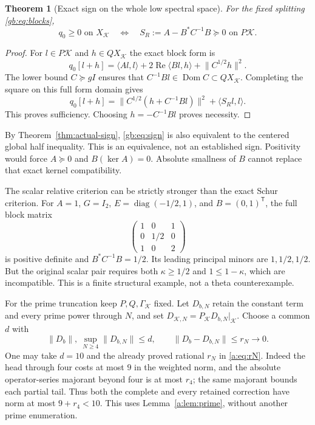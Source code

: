 \documentclass[11pt,a4paper]{article}
\numberwithin{equation}{section}
\newtheorem{theorem}{Theorem}[section]
\theoremstyle{definition}\newtheorem{definition}[theorem]{Definition}
\theoremstyle{remark}\newtheorem{remark}[theorem]{Remark}
\newcommand{\dom}{\operatorname{Dom}}\newcommand{\Var}{\operatorname{Var}}
\newcommand{\ip}[2]{\langle#1,#2\rangle}\newcommand{\norm}[1]{\lVert#1\rVert}\newcommand{\abs}[1]{\lvert#1\rvert}
\newcommand{\Kk}{\mathcal K}\newcommand{\Aa}{\mathcal A}\newcommand{\Ff}{\mathcal F}
\begin{document}
\begin{theorem}[Exact sign on the whole low spectral space]
\label{gb:thm:schur}
For the fixed splitting \eqref{gb:eq:blocks},
\begin{equation}\label{gb:eq:sign}
 q_0\ge0\text{ on }X_\Kk
 \quad\Longleftrightarrow\quad
 S_R:=A-B^*C^{-1}B\succeq0\text{ on }P\Kk.
\end{equation}
\end{theorem}
\begin{proof}
For $l\in P\Kk$ and $h\in QX_\Kk$ the exact block form is
\[
 q_0[l+h]=\ip{Al}{l}+2\operatorname{Re}\ip{Bl}{h}
                       +\norm{C^{1/2}h}^2.
\]
The lower bound $C\succeq gI$ ensures that
$C^{-1}Bl\in\dom C\subset QX_\Kk$. Completing the square on this
full form domain gives
\begin{equation}\label{gb:eq:square}
 q_0[l+h]=\norm{C^{1/2}(h+C^{-1}Bl)}^2+\ip{S_Rl}{l}.
\end{equation}
This proves sufficiency. Choosing $h=-C^{-1}Bl$ proves necessity.
\end{proof}
By Theorem~\ref{thm:actual-sign}, \eqref{gb:eq:sign} is also equivalent
to the centered global half inequality. This is an equivalence, not an
established sign. Positivity would force $A\succeq0$ and
$B(\ker A)=0$. Absolute smallness of $B$ cannot replace that exact
kernel compatibility.

The scalar relative criterion can be strictly stronger than the exact
Schur criterion. For $A=1$, $G=I_2$,
$E=\operatorname{diag}(-1/2,1)$, and $B=(0,1)^{\mathsf T}$, the full
block matrix
\[
 \begin{pmatrix}1&0&1\\0&1/2&0\\1&0&2\end{pmatrix}
\]
is positive definite and $B^*C^{-1}B=1/2$. Its leading principal
minors are $1,1/2,1/2$. But the original scalar pair requires both
$\kappa\ge1/2$ and $1\le1-\kappa$, which are incompatible.
This is a finite structural example, not a theta counterexample.

For the prime truncation keep $P,Q,\Gamma_\Kk$ fixed. Let $D_{b,N}$
retain the constant term and every prime power through $N$, and set
$D_{\Kk,N}=P_\Kk D_{b,N}|_\Kk$.
Choose a common $d$ with
\begin{equation}\label{gb:eq:truncation}
 \norm{D_b},\ \sup_{N\ge4}\norm{D_{b,N}}\le d,
 \qquad\norm{D_b-D_{b,N}}\le r_N\longrightarrow0.
\end{equation}
One may take $d=10$ and the already proved rational $r_N$ in
\eqref{a:eq:rN}. Indeed the head through four costs at most $9$ in
the weighted norm, and the absolute operator-series majorant beyond
four is at most $r_4$; the same majorant bounds each partial tail.
Thus both the complete and every retained correction have norm at most
$9+r_4<10$. This uses Lemma~\ref{a:lem:prime}, without another prime
enumeration.
\end{document}
